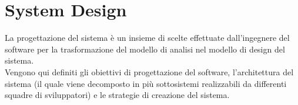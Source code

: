 
\chapter{System Design}
    La progettazione del sistema è un insieme di scelte effettuate dall'ingegnere del software per la trasformazione del modello di analisi nel modello di design del sistema. \\
    Vengono qui definiti gli obiettivi di progettazione del software, l'architettura del sistema (il quale viene decomposto in più sottosistemi realizzabili da differenti squadre di sviluppatori) e le strategie di creazione del sistema.

